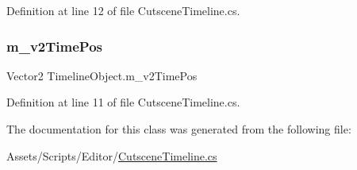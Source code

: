 Definition at line 12 of file Cutscene\+Timeline.\+cs.

\mbox{\label{class_timeline_object_a5e154851ddf5555e215918eaaf9090e8}} 
\subsubsection{\texorpdfstring{m\+\_\+v2\+Time\+Pos}{m\_v2TimePos}}
{\footnotesize\ttfamily Vector2 Timeline\+Object.\+m\+\_\+v2\+Time\+Pos}



Definition at line 11 of file Cutscene\+Timeline.\+cs.



The documentation for this class was generated from the following file\+:\begin{DoxyCompactItemize}
\item 
Assets/\+Scripts/\+Editor/\mbox{\hyperlink{_cutscene_timeline_8cs}{Cutscene\+Timeline.\+cs}}\end{DoxyCompactItemize}
